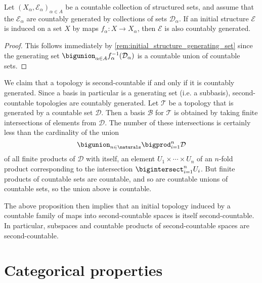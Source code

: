 \documentclass[article, a4paper, 11pt, oneside]{memoir}
\numberwithin{equation}{chapter}
\newcommand{\calT}{\mathcal{T}}
\newcommand{\calB}{\mathcal{B}}
\newcommand{\calE}{\mathcal{E}}
\newcommand{\calD}{\mathcal{D}}
\begin{document}
\begin{proposition}
    Let $(X_\alpha,\calE_\alpha)_{\alpha \in A}$ be a countable collection of structured sets, and assume that the $\calE_\alpha$ are countably generated by collections of sets $\calD_\alpha$. If an initial structure $\calE$ is induced on a set $X$ by maps $f_\alpha \colon X \to X_\alpha$, then $\calE$ is also countably generated.
\end{proposition}

\begin{proof}
    This follows immediately by \cref{rem:initial_structure_generating_set} since the generating set $\bigunion_{\alpha \in A} f_\alpha^{-1}(\calD_\alpha)$ is a countable union of countable sets.
\end{proof}


\begin{examplebreak}
    \label{ex:second_countable_space}
    We claim that a topology is second-countable if and only if it is countably generated. Since a basis in particular is a generating set (i.e. a subbasis), second-countable topologies are countably generated. Let $\calT$ be a topology that is generated by a countable set $\calD$. Then a basis $\calB$ for $\calT$ is obtained by taking finite intersections of elements from $\calD$. The number of these intersections is certainly less than the cardinality of the union
    \begin{equation*}
        \bigunion_{n \in \naturals} \bigprod_{i=1}^n \calD
    \end{equation*}
    of all finite products of $\calD$ with itself, an element $U_1 \times \cdots \times U_n$ of an $n$-fold product corresponding to the intersection $\bigintersect_{i=1}^n U_i$. But finite products of countable sets are countable, and so are countable unions of countable sets, so the union above is countable.
    
    The above proposition then implies that an initial topology induced by a countable family of maps into second-countable spaces is itself second-countable. In particular, subspaces and countable products of second-countable spaces are second-countable.
\end{examplebreak}



\section{Categorical properties} \label{sec:structure_categorical}
\end{document}
